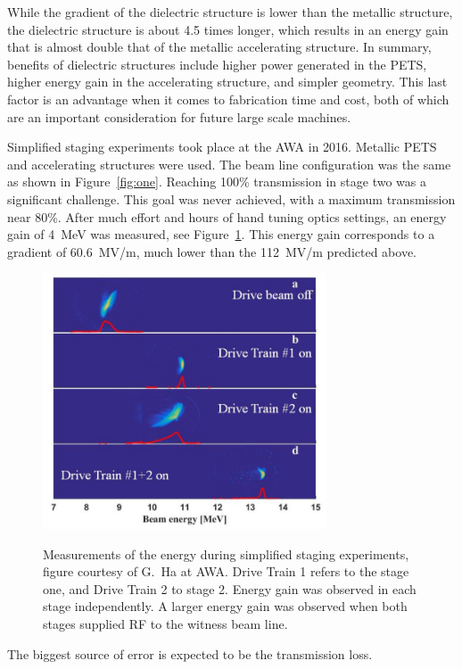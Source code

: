 While the gradient of the dielectric structure is lower than the metallic structure, the dielectric 
structure is about 4.5 times longer, which results in an energy gain that is 
almost double that of the metallic accelerating structure.
In summary, benefits of dielectric structures include higher power
generated in the PETS, higher energy gain in the accelerating structure, 
and simpler geometry. This last factor is an advantage when it comes 
to fabrication time and cost, both of which are an important consideration for future large scale machines. 



Simplified staging experiments took place at the AWA in 2016. 
Metallic PETS and accelerating structures were used. 
The beam line configuration was the same as shown in Figure~\ref{fig:one}.
Reaching 100\% transmission in stage two was a significant challenge.
This goal was never achieved, with a maximum transmission near 80\%. 
After much effort and hours of hand tuning optics settings, 
an energy gain of \SI{4}{MeV} was measured, see Figure~\ref{fig:old-tba}. 
This energy gain corresponds to a 
gradient of \SI{60.6}{MV/m}, much lower than the \SI{112}{MV/m} predicted above.
\begin{figure}
	\centering
	\includegraphics[width=0.75\textwidth]{images/old_tba}
	\label{fig:old-tba}
	\caption{Measurements of the energy during simplified staging experiments, 
		figure courtesy of G.~Ha at AWA.
		Drive Train 1 refers to the stage one, and Drive Train 2 to stage 2. 
		Energy gain was observed in each stage independently.
		A larger energy gain was observed when both stages supplied RF to the witness beam line.}
\end{figure}
The biggest source of error is expected to be the transmission loss. 




